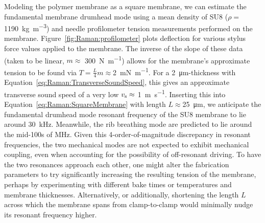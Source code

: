 Modeling the polymer membrane as a square membrane, we can estimate the fundamental membrane drumhead mode using a mean density of SU8 (\(\rho =\) \SI{1190}{\kilo\gram\per\cubic\meter}) \cite{roch2003fabrication} and needle profilometer tension measurements performed on the membrane. Figure~\ref{fig:Raman:profilometer} plots deflection for various stylus force values applied to the membrane. The inverse of the slope of these data (taken to be linear, \(m \approx\) \SI{300}{\newton\per\meter}) allows for the membrane's approximate tension to be found via \(T = \frac{L}{4}m \approx \)\SI{2}{\milli\newton\per\meter}. For a \SI{2}{\micro\meter}-thickness with Equation~\ref{eq:Raman:TransverseSoundSpeed}, this gives an approximate transverse sound speed of a very low \(v_{\rm s} \approx\) \SI{1}{\meter\per\second}. Inserting this into Equation~\ref{eq:Raman:SquareMembrane} with length \(L\approx\)\SI{25}{\micro\meter}, we anticipate the fundamental drumhead mode resonant frequency of the SU8 membrane to lie around \SI{30}{\kilo\hertz}. Meanwhile, the rib breathing mode are predicted to lie around the mid-100s of \si{\mega\hertz}. Given this 4-order-of-magnitude discrepancy in resonant frequencies, the two mechanical modes are not expected to exhibit mechanical coupling, even when accounting for the possibility of off-resonant driving. To have the two resonances approach each other, one might alter the fabrication parameters to try significantly increasing the resulting tension of the membrane, perhaps by experimenting with different bake times or temperatures and membrane thicknesses. Alternatively, or additionally, shortening the length \(L\) across which the membrane spans from clamp-to-clamp would minimally nudge its resonant frequency higher.

